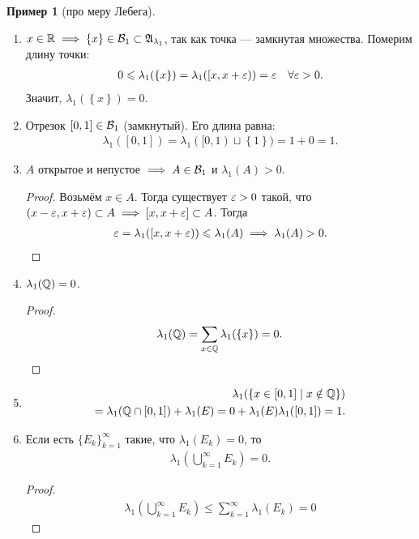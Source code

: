 \documentclass[a4paper,14pt]{extarticle}
\newcounter{theoremCnt}
\theoremstyle{definition}
\theoremstyle{plain}
\theoremstyle{plain}
\theoremstyle{plain}
\theoremstyle{plain}
\theoremstyle{definition}
\newtheorem{exmpl}[theoremCnt]{Пример}
\theoremstyle{definition}
\theoremstyle{definition}
\theoremstyle{definition}
\theoremstyle{definition}
\theoremstyle{definition}
\theoremstyle{plain}
\theoremstyle{plain}
\theoremstyle{plain}
\theoremstyle{plain}
\theoremstyle{definition}
\theoremstyle{definition}
\theoremstyle{definition}
\theoremstyle{definition}
\theoremstyle{definition}
\newcommand{\R}{\ensuremath \mathbb{R}}
\newcommand{\Q}{\ensuremath \mathbb{Q}}
\newcommand{\eps}{\ensuremath \varepsilon}
\newcommand{\A}{\ensuremath \mathfrak{A}}
\begin{document}
\begin{exmpl}[про меру Лебега]\
 \begin{enumerate}
  \item $x \in \R \implies \left\{ x \right\} \in \B_1 \subset \A_{\lambda_1}$, так как точка --- замкнутая множества. Померим длину точки:
  \begin{align*}
   0 \leqslant \lambda_1(\left\{ x \right\}) = \lambda_1([x, x + \varepsilon)) = \varepsilon \quad \forall \eps > 0
   .\end{align*} Значит, $\lambda_1(\left\{ x \right\}) = 0$.
  \item Отрезок $[0, 1] \in \mathcal{B}_1$ (замкнутый). Его длина равна:
  \begin{align*}
   \lambda_1([0,1]) = \lambda_1([0, 1) \sqcup \left\{ 1 \right\}) = 1 + 0 = 1
   .\end{align*}
  \item $A$ открытое и непустое $ \implies A \in \mathcal{B}_1$ и $\lambda_1(A) > 0$.
  \begin{proof}
   Возьмём $x \in A$. Тогда существует $\eps > 0$ такой, что $(x - \eps, x + \eps) \subset A \implies [x, x + \eps] \subset A$. Тогда
   \begin{align*}
    \eps = \lambda_1( [x, x + \eps) ) \leqslant \lambda_1(A) \implies \lambda_1(A) > 0
    .\end{align*}
  \end{proof}
  \item $\lambda_1(\Q) = 0$.
  \begin{proof}
   \begin{align*}
    \lambda_1(\Q) = \sum_{x \in \Q} \lambda_1(\left\{ x \right\}) = 0
    .\end{align*}
  \end{proof}
  \item \begin{align*}
   \lambda_1( \left\{ x \in [0,1] \mid x \notin \Q \right\} ) \\
   = \lambda_1(\Q \cap [0, 1]) + \lambda_1(E) = 0 + \lambda_1(E) \lambda_1([0, 1]) = 1
   .\end{align*}
  \item Если есть $\{E_{k}\}_{k=1}^{\infty} $ такие, что $\lambda_1(E_k) = 0$, то
  \begin{align*}
   \lambda_1 \left( \bigcup_{k=1}^{\infty} E_k \right) = 0
   .\end{align*}
  \begin{proof}
   \begin{align*}
    \lambda_1 \left( \bigcup_{k=1}^{\infty} E_k \right) \leqslant \sum_{k=1}^{\infty} \lambda_1(E_k) = 0

\end{align*}
\end{proof}
\end{enumerate}
\end{exmpl}
\end{document}
